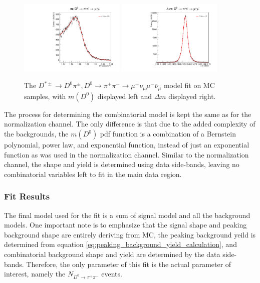 \begin{figure}[htp]
    \begin{center}
      \includegraphics[width=0.45\textwidth]{figures/chapter4/signal_fit/d0pipimm_2022_2023_0_m.pdf}
      \includegraphics[width=0.45\textwidth]{figures/chapter4/signal_fit/d0pipimm_2022_2023_0_dm.pdf}\\
    \end{center}
    \caption{
      The $D^{*\pm} \to D^0\pi^\pm, D^0 \to \pi^+ \pi^- \to \mu^+ \nu_\mu \mu^- \bar{\nu}_\mu$ model fit on MC samples, with $m(D^0)$ displayed left and $\Delta m$ displayed right.
    }
    \label{fig:d0munumunu_uml_fit}
\end{figure}


The process for determining the combinatorial model is kept the same as for the normalization channel. The only difference is that due to the added complexity of the backgrounds, the $m(D^0)$ pdf function is a combination of a Bernstein polynomial, power law, and exponential function, instead of just an exponential function as was used in the normalization channel. Similar to the normalization channel, the shape and yield is determined using data side-bands, leaving no combinatorial variables left to fit in the main data region.

\subsubsection{Fit Results}

The final model used for the fit is a sum of signal model and all the background models. One important note is to emphasize that the signal shape and peaking background shape are entirely deriving from MC, the peaking background yeild is determined from equation \ref{eq:peaking_background_yield_calculation}, and combinatorial background shape and yield are determined by the data side-bands. Therefore, the only parameter of this fit is the actual parameter of interest, namely the $N_{D^0 \to \pi^+ \pi^-}$ events. 

